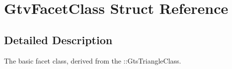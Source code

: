 \section{Gtv\+Facet\+Class Struct Reference}
\label{structGtvFacetClass}


\subsection{Detailed Description}
The basic facet class, derived from the \+::\+Gts\+Triangle\+Class. 